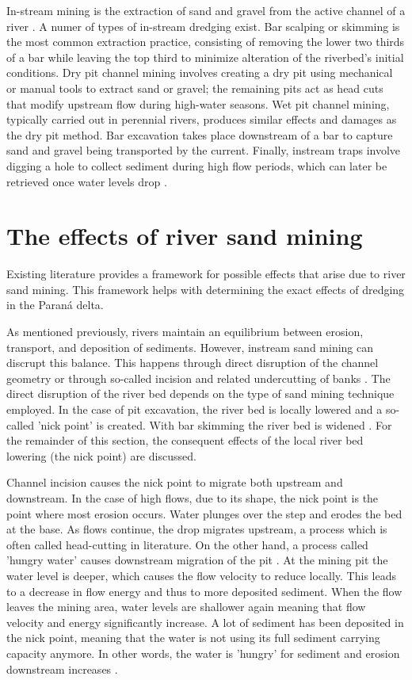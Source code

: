 In-stream mining is the extraction of sand and gravel from the active channel of a river \autocite{sand-mining-boek}. A numer of types of in-stream dredging exist. Bar scalping or skimming is the most common extraction practice, consisting of removing the lower two thirds of a bar while leaving the top third to minimize alteration of the riverbed’s initial conditions. Dry pit channel mining involves creating a dry pit using mechanical or manual tools to extract sand or gravel; the remaining pits act as head cuts that modify upstream flow during high-water seasons. Wet pit channel mining, typically carried out in perennial rivers, produces similar effects and damages as the dry pit method. Bar excavation takes place downstream of a bar to capture sand and gravel being transported by the current. Finally, instream traps involve digging a hole to collect sediment during high flow periods, which can later be retrieved once water levels drop \autocite{sand-mining-boek}.

\section{The effects of river sand mining}
Existing literature provides a framework for possible effects that arise due to river sand mining. This framework helps with determining the exact effects of dredging in the Paraná delta.

As mentioned previously, rivers maintain an equilibrium between erosion, transport, and deposition of sediments. However, instream sand mining can discrupt this balance. This happens through direct disruption of the channel geometry or through so-called incision and related undercutting of banks \autocite{sand-mining-boek}. The direct disruption of the river bed depends on the type of sand mining technique employed. In the case of pit excavation, the river bed is locally lowered and a so-called 'nick point' is created. With bar skimming the river bed is widened \autocite{sand-mining-boek}. For the remainder of this section, the consequent effects of the local river bed lowering (the nick point) are discussed.

Channel incision causes the nick point to migrate both upstream and downstream. In the case of high flows, due to its shape, the nick point is the point where most erosion occurs. Water plunges over the step and erodes the bed at the base. As flows continue, the drop migrates upstream, a process which is often called head-cutting in literature. On the other hand, a process called 'hungry water' causes downstream migration of the pit \autocite{sand-mining-boek}. At the mining pit the water level is deeper, which causes the flow velocity to reduce locally. This leads to a decrease in flow energy and thus to more deposited sediment. When the flow leaves the mining area, water levels are shallower again meaning that flow velocity and energy significantly increase. A lot of sediment has been deposited in the nick point, meaning that the water is not using its full sediment carrying capacity anymore. In other words, the water is 'hungry' for sediment and erosion downstream increases \autocite{sand-mining-boek}. 

